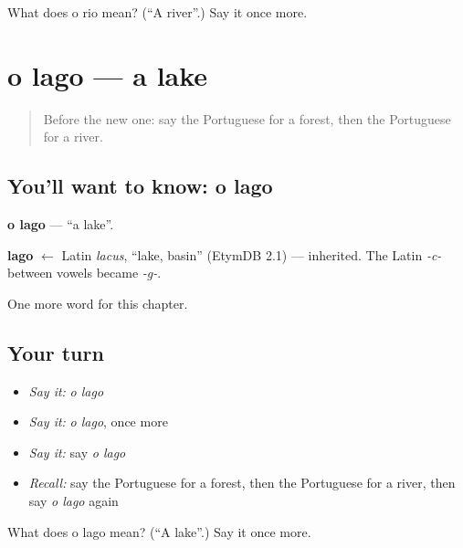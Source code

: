 \begin{tcolorbox}[breakable,colback=teal!4,colframe=teal!35!black,title={Before you move on}]
What does o rio mean? (\textquotedblleft{}A river\textquotedblright{}.) Say it once more.
\end{tcolorbox}
\section[o lago]{o lago — a lake}

\label{lesson:PT-C57-lago}



\begin{quote}
Before the new one: say the Portuguese for a forest, then the Portuguese for a river.
\end{quote}

\subsection*{You'll want to know: o lago}
\textbf{o lago} — \textquotedblleft{}a lake\textquotedblright{}.

\begin{cousinweb}
\textbf{lago} $\leftarrow$ Latin \emph{lacus}, \textquotedblleft{}lake, basin\textquotedblright{} (EtymDB 2.1) — inherited. The Latin \emph{-c-} between vowels became \emph{-g-}.
\end{cousinweb}

\begin{grammarlens}[title={What you've built}]
One more word for this chapter.
\end{grammarlens}

\subsection*{Your turn}
\begin{itemize}
\raggedright
  \item \emph{Say it:} \emph{o lago}
  \item \emph{Say it:} \emph{o lago}, once more
  \item \emph{Say it:} say \emph{o lago}
  \item \emph{Recall:} say the Portuguese for a forest, then the Portuguese for a river, then say \emph{o lago} again
\end{itemize}

\begin{tcolorbox}[breakable,colback=teal!4,colframe=teal!35!black,title={Before you move on}]
What does o lago mean? (\textquotedblleft{}A lake\textquotedblright{}.) Say it once more.
\end{tcolorbox}
